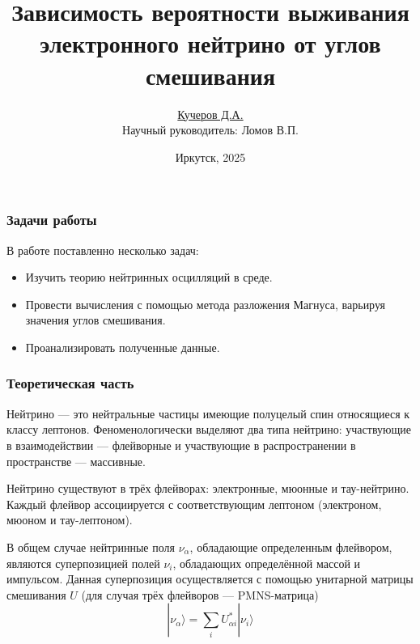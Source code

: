 \documentclass[utf8,9pt,mathserif,usepdftitle=false]{beamer}
\title{Зависимость вероятности выживания электронного нейтрино от углов
  смешивания}%
\author{\underline{Кучеров Д.А.}\\[7em]\raggedleft\footnotesize Научный руководитель:
  Ломов В.П.\\%
}%
\date[ИГУ, 2025]{\vfill%
  \small{}Иркутск, 2025}
\begin{document}
\begin{frame}
  \titlepage
\end{frame}

\begin{frame}
	\frametitle{Задачи работы}
  В работе поставленно несколько задач:
  \begin{itemize}
  \item<2-> Изучить теорию нейтринных осцилляций в среде.
  \item<3-> Провести вычисления с помощью метода разложения Магнуса, варьируя значения углов смешивания.
  \item<4-> Проанализировать полученные данные.
  \end{itemize}
\end{frame}

\begin{frame}
	\frametitle{Теоретическая часть}%
Нейтрино — это нейтральные частицы имеющие полуцелый спин относящиеся к классу
лептонов. Феноменологически выделяют два типа нейтрино: участвующие в
взаимодействии — флейворные и участвующие в распространении в пространстве —
массивные.

	Нейтрино существуют в трёх флейворах: электронные, мюонные и
  тау-нейтрино. Каждый флейвор ассоциируется с соответствующим лептоном
  (электроном, мюоном и тау-лептоном).
  
  В общем случае нейтринные поля \(\nu_{\alpha}\), обладающие определенным флейвором, являются суперпозицией полей \(\nu_{i}\), обладающих определённой массой и импульсом. Данная суперпозиция осуществляется с помощью унитарной матрицы смешивания \(U\) (для случая трёх флейворов --- PMNS-матрица)
  \begin{equation}
  	|\nu_{\alpha}\rangle=\sum_{i}U_{\alpha i}^{*}|\nu_{i}\rangle
  \end{equation}

\end{frame}
\end{document}
